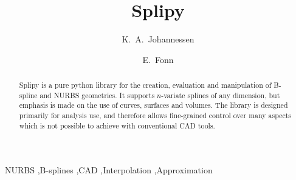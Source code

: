 \documentclass[preprint,12pt, a4paper]{elsarticle}
\begin{document}
\begin{frontmatter}



\title{Splipy}


\author{K.~A.~Johannessen}
\author{E.~Fonn}

\address{SINTEF Digital, PO Box 4760, 7465, Trondheim, Norway}

\begin{abstract}
Splipy is a pure python library for the creation, evaluation and manipulation of B-spline and NURBS geometries.
It supports $n$-variate splines of any dimension, but emphasis is made on the use of curves, surfaces and volumes.
The library is designed primarily for analysis use, and therefore allows fine-grained control over many aspects which is not possible to achieve with conventional CAD tools.

\end{abstract}

\begin{keyword}
NURBS \sep B-splines \sep CAD \sep Interpolation \sep Approximation



\end{keyword}

\end{frontmatter}
\end{document}
